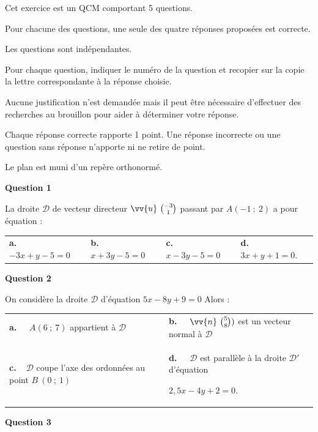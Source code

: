 \medskip

Cet exercice est un QCM comportant 5 questions. 

Pour chacune des questions, une seule des quatre réponses proposées est correcte. 

Les questions sont indépendantes.

Pour chaque question, indiquer le numéro de la question et recopier sur la copie la lettre correspondante à la réponse choisie.

Aucune justification n'est demandée mais il peut être nécessaire d'effectuer des recherches au brouillon pour aider à déterminer votre réponse.

Chaque réponse correcte rapporte 1 point. Une réponse incorrecte ou une question sans réponse n'apporte ni ne retire de point.

\bigskip

Le plan est muni d'un repère orthonormé.

\medskip

\textbf{Question 1}

\medskip 

La droite $\mathcal{D}$ de vecteur directeur $\vv{u}\ \binom{-3}{1}$ passant par $A(-1~;~2)$ a pour équation :

\medskip

\begin{tabularx}{\linewidth}{*{4}{X}}
\textbf{a.~~} $-3x+y-5=0 $ &\textbf{b.~~} $x+3y-5=0 $&\textbf{c.~~} $x-3y-5=0 $& \textbf{d.~~} $3x+y+1=0  $.
\end{tabularx}

\medskip

\textbf{Question 2}

\medskip 

On considère la droite $\mathcal{D}$ d'équation $5x-8y+9=0$ Alors :

\medskip

\begin{tabularx}{\linewidth}{*{2}{X}}
\textbf{a.~~} $ A(6~;~7) $ appartient à $\mathcal{D}$ &\textbf{b.~~} $\vv{n}\ \binom{5}{8})$ est un vecteur normal à $\mathcal{D}$ \\
\textbf{c.~~}$\mathcal{D}$ coupe l'axe des ordonnées au point $B\ (0~;~1) $& \textbf{d.~~} $\mathcal{D}$ est parallèle à la droite $\mathcal{D}'$ d'équation 

$2,5x - 4y + 2 = 0$.
\end{tabularx}

\medskip

\textbf{Question 3}

